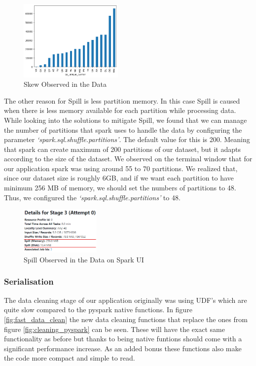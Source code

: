 \begin{figure}[H]
\centering
\includegraphics[width=0.45\textwidth]{fig/skew.png}
\caption{Skew Observed in the Data}
\label{fig:skew}
\end{figure}

The other reason for Spill is less partition memory. In this case Spill is caused when there is less memory available for each partition while processing data. While looking into the solutions to mitigate Spill, we found that we can manage the number of partitions that spark uses to handle the data by configuring the parameter \emph{‘spark.sql.shuffle.partitions’}. The default value for this is 200. Meaning that spark can create maximum of 200 partitions of our dataset, but it adapts according to the size of the dataset. We observed on the terminal window that for our application spark was using around 55 to 70 partitions. We realized that, since our dataset size is roughly 6GB, and if we want each partition to have minimum 256 MB of memory, we should set the numbers of partitions to 48. Thus, we configured the \emph{‘spark.sql.shuffle.partitions’} to 48.

\begin{figure}[H]
\centering
\includegraphics[width=0.35\textwidth]{fig/Spill 2.png}
\caption{Spill Observed in the Data on Spark UI}
\label{fig: spill}
\end{figure}



\subsubsection{Serialisation}
The data cleaning stage of our application originally was using UDF's which are quite slow compared to the pyspark native functions. In figure \ref{fig:fast_data_clean} the new data cleaning functions that replace the ones from figure \ref{fig:cleaning_pyspark} can be seen. These will have the exact same functionality as before but thanks to being native funtions should come with a significant performance increase. As an added bonus these functions also make the code more compact and simple to read.

